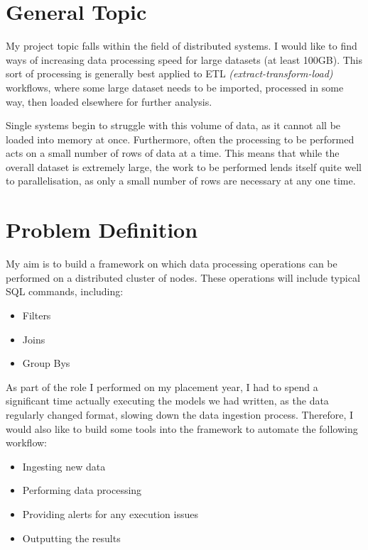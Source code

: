 \documentclass[12pt]{article}
\begin{document}
	\maketitle
	
	\section{General Topic}
	
	My project topic falls within the field of distributed systems. I would like to find ways of increasing data processing speed for large datasets (at least 100GB). This sort of processing is generally best applied to ETL \textit{(extract-transform-load)} workflows, where some large dataset needs to be imported, processed in some way, then loaded elsewhere for further analysis. \medskip
	
	Single systems begin to struggle with this volume of data, as it cannot all be loaded into memory at once. Furthermore, often the processing to be performed acts on a small number of rows of data at a time. This means that while the overall dataset is extremely large, the work to be performed lends itself quite well to parallelisation, as only a small number of rows are necessary at any one time.
	
	\section{Problem Definition}
	
	My aim is to build a framework on which data processing operations can be performed on a distributed cluster of nodes. These operations will include typical SQL commands, including:
	\begin{itemize}
		\item Filters
		\item Joins
		\item Group Bys
	\end{itemize}

	
	As part of the role I performed on my placement year, I had to spend a significant time actually executing the models we had written, as the data regularly changed format, slowing down the data ingestion process. Therefore, I would also like to build some tools into the framework to automate the following workflow:
	\begin{itemize}
		\item Ingesting new data
		\item Performing data processing
		\item Providing alerts for any execution issues
		\item Outputting the results
	\end{itemize}
	
\end{document}
